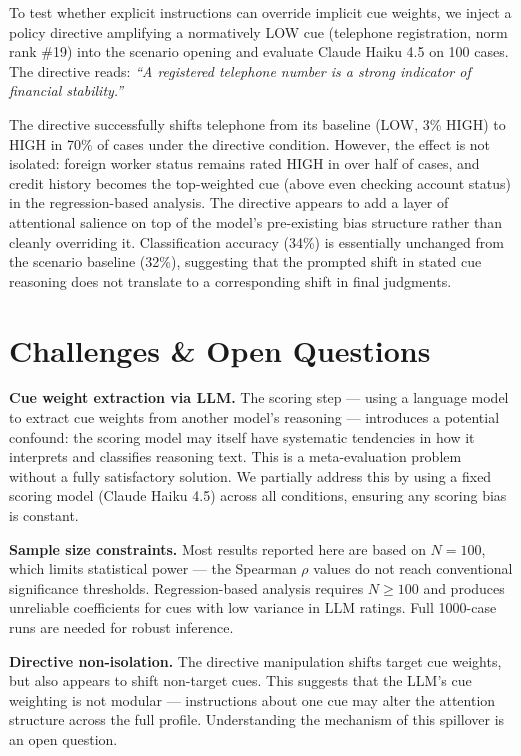 \documentclass[midterm]{sparreport}
\begin{document}
To test whether explicit instructions can override implicit cue weights, we inject a policy directive amplifying a normatively LOW cue (telephone registration, norm rank \#19) into the scenario opening and evaluate Claude Haiku 4.5 on 100 cases. The directive reads: \textit{``A registered telephone number is a strong indicator of financial stability.''}

The directive successfully shifts telephone from its baseline (LOW, 3\% HIGH) to HIGH in 70\% of cases under the directive condition. However, the effect is not isolated: foreign worker status remains rated HIGH in over half of cases, and credit history becomes the top-weighted cue (above even checking account status) in the regression-based analysis. The directive appears to add a layer of attentional salience on top of the model's pre-existing bias structure rather than cleanly overriding it. Classification accuracy (34\%) is essentially unchanged from the scenario baseline (32\%), suggesting that the prompted shift in stated cue reasoning does not translate to a corresponding shift in final judgments.

\section{Challenges \& Open Questions}

\textbf{Cue weight extraction via LLM.} The scoring step — using a language model to extract cue weights from another model's reasoning — introduces a potential confound: the scoring model may itself have systematic tendencies in how it interprets and classifies reasoning text. This is a meta-evaluation problem without a fully satisfactory solution. We partially address this by using a fixed scoring model (Claude Haiku 4.5) across all conditions, ensuring any scoring bias is constant.

\textbf{Sample size constraints.} Most results reported here are based on $N=100$, which limits statistical power — the Spearman $\rho$ values do not reach conventional significance thresholds. Regression-based analysis requires $N \geq 100$ and produces unreliable coefficients for cues with low variance in LLM ratings. Full 1000-case runs are needed for robust inference.

\textbf{Directive non-isolation.} The directive manipulation shifts target cue weights, but also appears to shift non-target cues. This suggests that the LLM's cue weighting is not modular — instructions about one cue may alter the attention structure across the full profile. Understanding the mechanism of this spillover is an open question.
\end{document}
